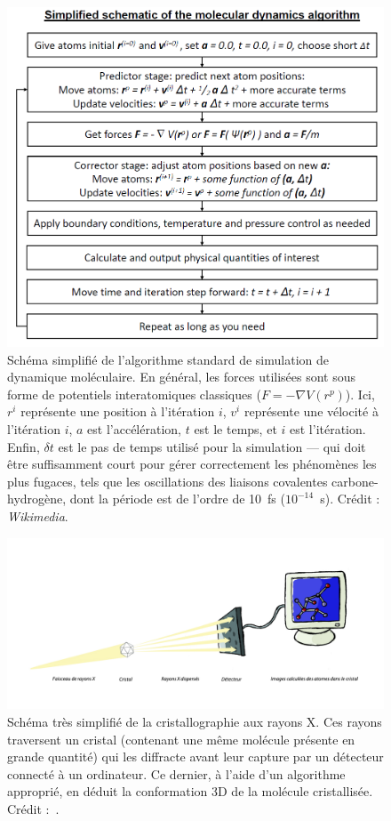 	\begin{figure}[H]
		\centering
		\includegraphics[width=\textwidth]{figures/ch1/moldyn}
		\caption{Schéma simplifié de l'algorithme standard de simulation de dynamique moléculaire. En général, les forces utilisées sont sous forme de potentiels interatomiques classiques ($F = -\nabla V\left(r^{p}\right)$). Ici, $r^{i}$ représente une position à l'itération $i$, $v^{i}$ représente une vélocité à l'itération $i$, $a$ est l'accélération, $t$ est le temps, et $i$ est l'itération. Enfin, $\delta{}t$ est le pas de temps utilisé pour la simulation --- qui doit être suffisamment court pour gérer correctement les phénomènes les plus fugaces, tels que les oscillations des liaisons covalentes carbone-hydrogène, dont la période est de l'ordre de 10~fs ($10^{-14}$~s). Crédit : \emph{Wikimedia}.}
		\label{fig:moldyn}
	\end{figure}
	
	\begin{figure}[H]
		\centering
		\includegraphics[width=\textwidth]{figures/ch1/crystal}
		\caption{Schéma très simplifié de la cristallographie aux rayons X. Ces rayons traversent un cristal (contenant une même molécule présente en grande quantité) qui les diffracte avant leur capture par un détecteur connecté à un ordinateur. Ce dernier, à l'aide d'un algorithme approprié, en déduit la conformation 3D de la molécule cristallisée. Crédit :~\cite{trellet2015exploration}.}
		\label{fig:crystal}
	\end{figure}
	
